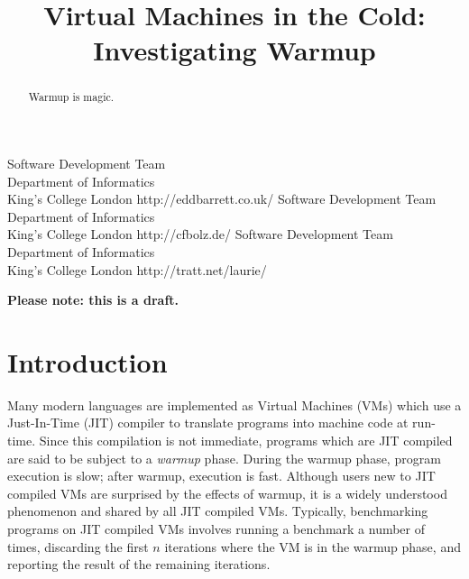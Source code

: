 \documentclass[10pt,preprint]{sigplanconf}
\begin{document}
\title{Virtual Machines in the Cold: Investigating Warmup}
           {Software Development Team\\ Department of Informatics\\ King's College London}
           {http://eddbarrett.co.uk/}
           {Software Development Team\\ Department of Informatics\\ King's College London}
           {http://cfbolz.de/}
           {Software Development Team\\ Department of Informatics\\ King's College London}
           {http://tratt.net/laurie/}

\maketitle

\noindent\textbf{Please note: this is a draft.}

\begin{abstract}
Warmup is magic.
\end{abstract}

\section{Introduction}
\label{sec:intro}



Many modern languages are implemented as Virtual Machines (VMs) which use a
Just-In-Time (JIT) compiler to translate programs into machine code at run-time.
Since this compilation is not immediate, programs which are JIT compiled are
said to be subject to a \emph{warmup} phase. During the warmup phase, program
execution is slow; after warmup, execution is fast. Although users new to JIT
compiled VMs are surprised by the effects of warmup, it is a widely understood
phenomenon and shared by all JIT compiled VMs. Typically, benchmarking programs
on JIT compiled VMs involves running a benchmark a number of times, discarding
the first $n$ iterations where the VM is in the warmup phase, and reporting the
result of the remaining iterations.
\end{document}
